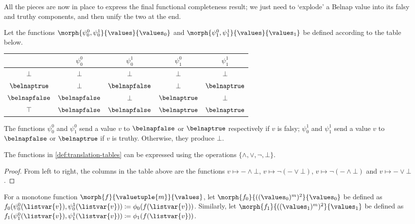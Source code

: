 All the pieces are now in place to express the final functional completeness
result; we just need to `explode' a Belnap value into its falsy and truthy
components, and then unify the two at the end.

\begin{definition}
    \label{def:translation-tables}
    Let the functions \(\morph{\psi^0_0,\psi^1_0}{\values}{\values_0}\) and
    \(\morph{\psi^0_1,\psi^1_1}{\values}{\values_1}\) be defined according to
    the table below.
    \begin{center}
        \begin{tabular}{c|cccc}
                             & \(\psi^0_0\)     & \(\psi^1_0\)     & \(\psi^0_1\)    & \(\psi^1_1\)    \\
            \hline
            \(\bot\)         & \(\bot\)         & \(\bot\)         & \(\bot\)        & \(\bot\)        \\
            \(\belnaptrue\)  & \(\bot\)         & \(\belnapfalse\) & \(\bot\)        & \(\belnaptrue\) \\
            \(\belnapfalse\) & \(\belnapfalse\) & \(\bot\)         & \(\belnaptrue\) & \(\bot\)        \\
            \(\top\)         & \(\belnapfalse\) & \(\belnapfalse\) & \(\belnaptrue\) & \(\belnaptrue\) \\
        \end{tabular}
    \end{center}
\end{definition}

The functions \(\psi^0_0\) and \(\psi^0_1\) send a value \(v\) to
\(\belnapfalse\) or \(\belnaptrue\) respectively if \(v\) is falsy;
\(\psi^1_0\) and \(\psi^1_1\) send a value \(v\) to
\(\belnapfalse\) or \(\belnaptrue\) if \(v\) is truthy.
Otherwise, they produce \(\bot\).

\begin{lemma}
    \label{lem:translation-functions}
    The functions in \cref{def:translation-tables} can be expressed using the
    operations \(\{\land,\lor,\neg,\bot\}\).
\end{lemma}
\begin{proof}
    From left to right, the columns in the table above are the functions \(
    v \mapsto - \land \bot
    \), \(
    v \mapsto \neg(- \lor \bot)
    \), \(
    v \mapsto \neg(- \land \bot)
    \) and \(
    v \mapsto - \lor \bot
    \).
\end{proof}

\begin{definition}\label{def:falsy-truthy-functions}
    For a monotone function \(\morph{f}{\valuetuple{m}}{\values}\), let
    \(\morph{f_0}{((\values_0)^m)^2}{\values_0}\) be defined as
    \(
    f_0(\psi^0_0(\listvar{v}), \psi^1_0(\listvar{v}))
    \coloneqq
    \phi_0(f(\listvar{v}))
    \).
    Similarly, let \(\morph{f_1}{((\values_1)^m)^2}{\values_1}\) be defined as
    \(
    f_1(\psi^0_1(\listvar{v}), \psi^1_1(\listvar{v}))
    \coloneqq
    \phi_1(f(\listvar{v}))
    \).
\end{definition}

